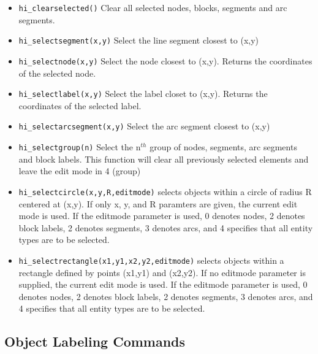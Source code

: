 \begin{itemize}
\item {\tt hi\_clearselected()} Clear all selected nodes, blocks, segments and arc
segments.

\item {\tt hi\_selectsegment(x,y)} Select the line segment closest to (x,y)

\item {\tt hi\_selectnode(x,y)} Select the node closest to (x,y).
Returns the coordinates of the selected node.

\item {\tt hi\_selectlabel(x,y)} Select the label closet to (x,y).
Returns the coordinates of the selected label.

\item {\tt hi\_selectarcsegment(x,y)} Select the arc segment closest to (x,y)

\item {\tt hi\_selectgroup(n)} Select the n$^{th}$ group of nodes, segments, arc
segments and block labels. This function will clear all previously selected
elements and leave the edit mode in 4 (group)

\item{\tt hi\_selectcircle(x,y,R,editmode)} selects objects within a circle of radius
R centered at (x,y).  If only x, y, and R paramters are given, the current
edit mode is used.  If the editmode parameter is used, 0 denotes nodes, 2
denotes block labels, 2 denotes segments, 3 denotes arcs, and 4 specifies
that all entity types are to be selected.

\item{\tt hi\_selectrectangle(x1,y1,x2,y2,editmode)} selects objects within a rectangle
defined by points (x1,y1) and (x2,y2). If no editmode parameter is supplied,
the current edit mode is used.  If the editmode parameter is used, 0 denotes
nodes, 2 denotes block labels, 2 denotes segments, 3 denotes arcs, and 4 
specifies that all entity types are to be selected.
\end{itemize}


\subsection{Object Labeling Commands}

